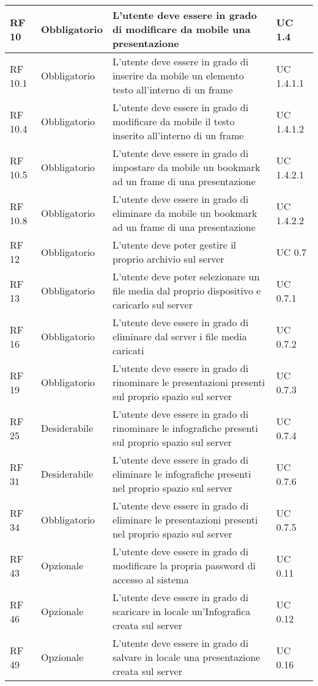 {\begin{longtable} [c]{| p{2.5cm} | p{2.5cm} | p{6cm} |p{2.5cm}|}
 \hline 
RF 10 & Obbligatorio & L’utente deve essere in grado di modificare da mobile una presentazione & UC 1.4\\ 
 \hline 
RF 10.1 & Obbligatorio & L'utente deve essere in grado di inserire da mobile un elemento testo all'interno di un frame & UC 1.4.1.1\\ 
 \hline 
RF 10.4 & Obbligatorio & L'utente deve essere in grado di modificare da mobile il testo inserito all'interno di un frame & UC 1.4.1.2\\ 
 \hline 
RF 10.5 & Obbligatorio & L'utente deve essere in grado di impostare da mobile un bookmark ad un frame di una presentazione & UC 1.4.2.1\\ 
 \hline 
RF 10.8 & Obbligatorio & L'utente deve essere in grado di eliminare da mobile un bookmark ad un frame di una presentazione & UC 1.4.2.2\\ 
 \hline 
RF 12 & Obbligatorio & L'utente deve poter gestire il proprio archivio sul server & UC 0.7\\ 
 \hline 
RF 13 & Obbligatorio & L’utente deve poter selezionare un file media dal proprio dispositivo e caricarlo sul server & UC 0.7.1\\ 
 \hline 
RF 16 & Obbligatorio & L’utente deve essere in grado di eliminare dal server i file media caricati & UC 0.7.2\\ 
 \hline 
RF 19 & Obbligatorio & L'utente deve essere in grado di rinominare le presentazioni presenti sul proprio spazio sul server & UC 0.7.3\\ 
 \hline 
RF 25 & Desiderabile & L'utente deve essere in grado di rinominare le infografiche presenti sul proprio spazio sul server & UC 0.7.4\\ 
 \hline 
RF 31 & Desiderabile & L'utente deve essere in grado di eliminare le infografiche presenti nel proprio spazio sul server & UC 0.7.6\\ 
 \hline 
RF 34 & Obbligatorio & L’utente deve essere in grado di eliminare le presentazioni presenti nel proprio spazio sul server & UC 0.7.5\\ 
 \hline 
RF 43 & Opzionale & L’utente deve essere in grado di modificare la propria password di accesso al sistema & UC 0.11\\ 
 \hline 
RF 46 & Opzionale & L’utente deve essere in grado di scaricare in locale un’Infografica creata sul server & UC 0.12\\ 
 \hline 
RF 49 & Opzionale & L’utente deve essere in grado di salvare in locale una presentazione creata sul server & UC 0.16\\ 

\end{longtable}}
